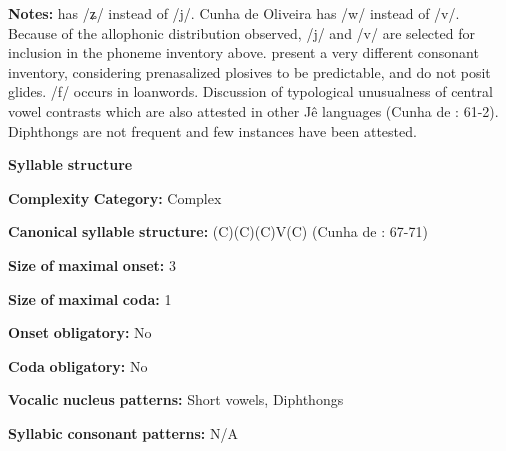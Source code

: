 \begin{styleBody}
\textbf{Notes:} \citet{Ham2009} has /ʑ/ instead of /j/. Cunha de Oliveira has /w/ instead of /v/. Because of the allophonic distribution observed, /j/ and /v/ are selected for inclusion in the phoneme inventory above. \citet{BurgessHam1968} present a very different consonant inventory, considering prenasalized plosives to be predictable, and do not posit glides. /f/ occurs in loanwords. Discussion of typological unusualness of central vowel contrasts which are also attested in other Jê languages (Cunha de \citealt{Oliveira2005}: 61-2). Diphthongs are not frequent and few instances have been attested.
\end{styleBody}

\begin{styleBody}
\textbf{Syllable} \textbf{structure}
\end{styleBody}

\begin{styleBody}
\textbf{Complexity} \textbf{Category:} Complex
\end{styleBody}

\begin{styleBody}
\textbf{Canonical} \textbf{syllable} \textbf{structure:} (C)(C)(C)V(C) (Cunha de \citealt{Oliveira2005}: 67-71)
\end{styleBody}

\begin{styleBody}
\textbf{Size} \textbf{of} \textbf{maximal} \textbf{onset:} 3
\end{styleBody}

\begin{styleBody}
\textbf{Size} \textbf{of} \textbf{maximal} \textbf{coda:} 1
\end{styleBody}

\begin{styleBody}
\textbf{Onset} \textbf{obligatory:} No
\end{styleBody}

\begin{styleBody}
\textbf{Coda} \textbf{obligatory:} No
\end{styleBody}

\begin{styleBody}
\textbf{Vocalic} \textbf{nucleus} \textbf{patterns:} Short vowels, Diphthongs
\end{styleBody}

\begin{styleBody}
\textbf{Syllabic} \textbf{consonant} \textbf{patterns:} N/A
\end{styleBody}

